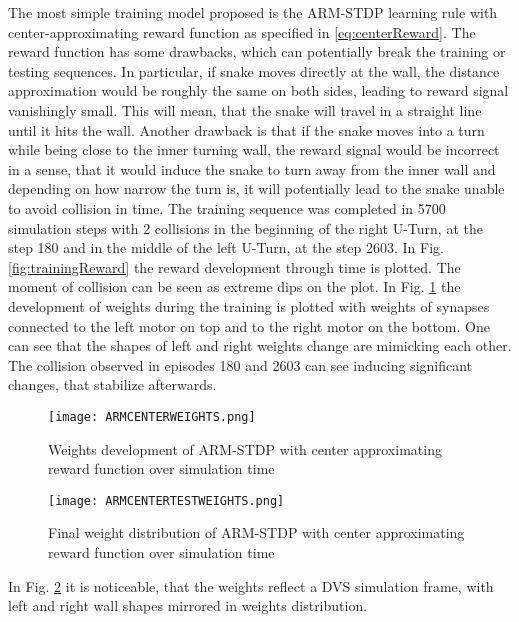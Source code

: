 The most simple training model proposed is the ARM-STDP learning rule with center-approximating reward function as specified in \eqref{eq:centerReward}. The reward function has some drawbacks, which can potentially break the training or testing sequences. In particular, if snake moves directly at the wall, the distance approximation would be roughly the same on both sides, leading to reward signal vanishingly small. This will mean, that the snake will travel in a straight line until it hits the wall. Another drawback is that if the snake moves into a turn while being close to the inner turning wall, the reward signal would be incorrect in a sense, that it would induce the snake to turn away from the inner wall and depending on how narrow the turn is, it will potentially lead to the snake unable to avoid collision in time.
The training sequence was completed in 5700 simulation steps with 2 collisions in the beginning of the right U-Turn, at the step 180 and in the middle of the left U-Turn, at the step 2603. In Fig. \ref{fig:trainingReward} the reward development through time is plotted. The moment of collision can be seen as extreme dips on the plot. In Fig. \ref{fig:armcenterweight} the development of weights during the training is plotted with weights of synapses connected to the left motor on top and to the right motor on the bottom. One can see that the shapes of left and right weights change are mimicking each other. The collision observed in episodes 180 and 2603 can see inducing significant changes, that stabilize afterwards.

\begin{figure}[h]
	\centering
	\texttt{[image: ARMCENTERWEIGHTS.png]}
	\caption{Weights development of ARM-STDP with center approximating reward function over simulation time}\label{fig:armcenterweight}
\end{figure}
\begin{figure}[h]
	\centering
	\texttt{[image: ARMCENTERTESTWEIGHTS.png]}
	\caption{Final weight distribution of ARM-STDP with center approximating reward function over simulation time}\label{fig:armcentertestweight}
\end{figure}

In Fig. \ref{fig:armcentertestweight} it is noticeable, that the weights reflect a DVS simulation frame, with left and right wall shapes mirrored in weights distribution.

